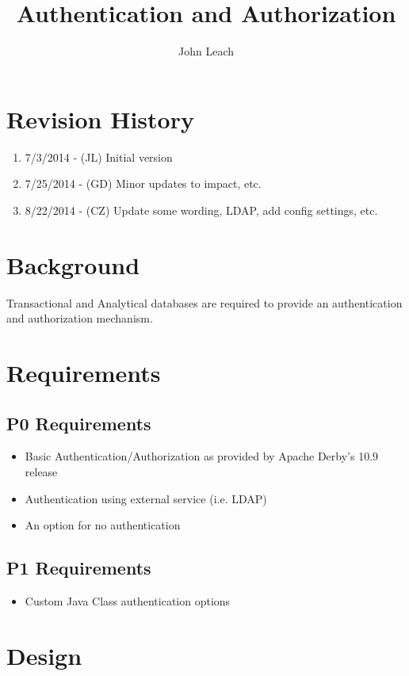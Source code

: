 \documentclass{article}
\begin{document}
\title{Authentication and Authorization}
\author{John Leach}
\maketitle
\makeauthor
\thispagestyle{fancy}

\section{Revision History}
\begin{enumerate}
  \item 7/3/2014 - (JL) Initial version
  \item 7/25/2014 - (GD) Minor updates to impact, etc.
  \item 8/22/2014 - (CZ) Update some wording, LDAP, add config settings, etc.
\end{enumerate}

\section{Background}
Transactional and Analytical databases are required to provide an
authentication and authorization mechanism.

\section{Requirements}

\subsection{P0 Requirements}
\begin{itemize}
  \item Basic Authentication/Authorization as provided by Apache Derby's 10.9 release
  \item Authentication using external service (i.e. LDAP)
  \item An option for no authentication
\end{itemize}

\subsection{P1 Requirements}
\begin{itemize}
  \item Custom Java Class authentication options
\end{itemize}


\section{Design}
\end{document}
